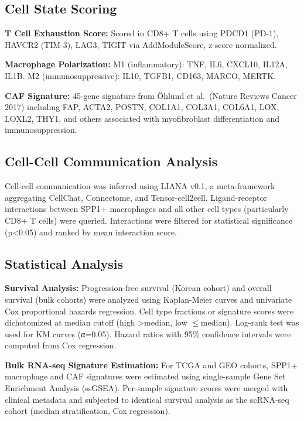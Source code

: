 \documentclass[12pt,twoside]{article}
\begin{document}
\subsection{Cell State Scoring}

\textbf{T Cell Exhaustion Score:} Scored in CD8+ T cells using PDCD1 (PD-1), HAVCR2 (TIM-3), LAG3, TIGIT via AddModuleScore, z-score normalized.

\textbf{Macrophage Polarization:} M1 (inflammatory): TNF, IL6, CXCL10, IL12A, IL1B. M2 (immunosuppressive): IL10, TGFB1, CD163, MARCO, MERTK.

\textbf{CAF Signature:} 45-gene signature from Öhlund et al.\ (Nature Reviews Cancer 2017) including FAP, ACTA2, POSTN, COL1A1, COL3A1, COL6A1, LOX, LOXL2, THY1, and others associated with myofibroblast differentiation and immunosuppression.

\subsection{Cell-Cell Communication Analysis}

Cell-cell communication was inferred using LIANA v0.1, a meta-framework aggregating CellChat, Connectome, and Tensor-cell2cell. Ligand-receptor interactions between SPP1+ macrophages and all other cell types (particularly CD8+ T cells) were queried. Interactions were filtered for statistical significance (p<0.05) and ranked by mean interaction score.

\subsection{Statistical Analysis}

\textbf{Survival Analysis:} Progression-free survival (Korean cohort) and overall survival (bulk cohorts) were analyzed using Kaplan-Meier curves and univariate Cox proportional hazards regression. Cell type fractions or signature scores were dichotomized at median cutoff (high >median, low $\leq$median). Log-rank test was used for KM curves (α=0.05). Hazard ratios with 95\% confidence intervals were computed from Cox regression.

\textbf{Bulk RNA-seq Signature Estimation:} For TCGA and GEO cohorts, SPP1+ macrophage and CAF signatures were estimated using single-sample Gene Set Enrichment Analysis (ssGSEA). Per-sample signature scores were merged with clinical metadata and subjected to identical survival analysis as the scRNA-seq cohort (median stratification, Cox regression).
\end{document}
